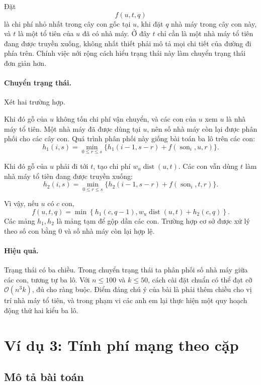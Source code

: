 \documentclass[11pt]{article}
\newcommand{\Oh}{\mathcal{O}}
\newcommand{\dist}{\operatorname{dist}}
\begin{document}
Đặt
\[
  f(u,t,q)
\]
là chi phí nhỏ nhất trong cây con gốc tại \(u\), khi đặt \(q\) nhà máy trong
cây con này, và \(t\) là một tổ tiên của \(u\) đã có nhà máy. Ở đây \(t\) chỉ
cần là một nhà máy tổ tiên đang được truyền xuống, không nhất thiết phải mô tả
mọi chi tiết của đường đi phía trên. Chính việc nới rộng cách hiểu trạng thái
này làm chuyển trạng thái đơn giản hơn.

\paragraph{Chuyển trạng thái.}
Xét hai trường hợp.

 Khi đó gỗ của \(u\) không tốn chi phí vận
chuyển, và các con của \(u\) xem \(u\) là nhà máy tổ tiên. Một nhà máy đã được
dùng tại \(u\), nên số nhà máy còn lại được phân phối cho các cây con. Quá
trình phân phối này giống bài toán ba lô trên các con:
\[
  h_1(i,s)=
  \min_{0\le r\le s}
  \bigl\{h_1(i-1,s-r)+f(\operatorname{son}_i,u,r)\bigr\}.
\]

 Khi đó gỗ của \(u\) phải đi tới \(t\), tạo
chi phí \(w_u\dist(u,t)\). Các con vẫn dùng \(t\) làm nhà máy tổ tiên đang
được truyền xuống:
\[
  h_2(i,s)=
  \min_{0\le r\le s}
  \bigl\{h_2(i-1,s-r)+f(\operatorname{son}_i,t,r)\bigr\}.
\]

Vì vậy, nếu \(u\) có \(c\) con,
\[
  f(u,t,q)=
  \min\left\{
    h_1(c,q-1),
    w_u\dist(u,t)+h_2(c,q)
  \right\}.
\]
Các mảng \(h_1,h_2\) là mảng tạm để gộp dần các con. Trường hợp cơ sở được
xử lý theo số con bằng \(0\) và số nhà máy còn lại hợp lệ.

\paragraph{Hiệu quả.}
Trạng thái có ba chiều. Trong chuyển trạng thái ta phân phối số nhà máy giữa
các con, tương tự ba lô. Với \(n\le 100\) và \(k\le 50\), cách cài đặt chuẩn
có thể đạt cỡ \(\Oh(n^3k)\), đủ cho ràng buộc. Điểm đáng chú ý của bài là
phải thêm chiều cho vị trí nhà máy tổ tiên, và trong phạm vi các anh em lại
thực hiện một quy hoạch động thứ hai kiểu ba lô.

\section{Ví dụ 3: Tính phí mạng theo cặp}

\subsection{Mô tả bài toán}
\end{document}
